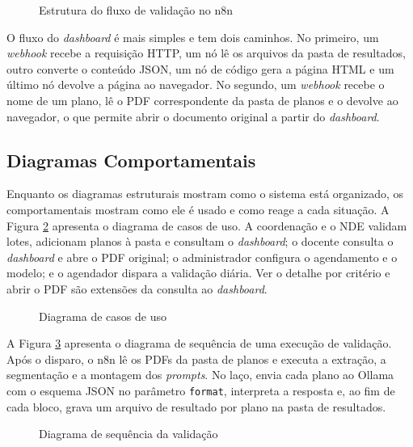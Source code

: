\begin{figure}[htbp]
\centering
\caption{Estrutura do fluxo de validação no n8n}
\label{fig:pipeline}
\resizebox{\textwidth}{!}{}
\end{figure}

O fluxo do \textit{dashboard} é mais simples e tem dois caminhos. No primeiro, um \textit{webhook} recebe a requisição HTTP, um nó lê os arquivos da pasta de resultados, outro converte o conteúdo JSON, um nó de código gera a página HTML e um último nó devolve a página ao navegador. No segundo, um \textit{webhook} recebe o nome de um plano, lê o PDF correspondente da pasta de planos e o devolve ao navegador, o que permite abrir o documento original a partir do \textit{dashboard}.

\subsection{Diagramas Comportamentais}

Enquanto os diagramas estruturais mostram como o sistema está organizado, os comportamentais mostram como ele é usado e como reage a cada situação. A Figura \ref{fig:casos} apresenta o diagrama de casos de uso. A coordenação e o NDE validam lotes, adicionam planos à pasta e consultam o \textit{dashboard}; o docente consulta o \textit{dashboard} e abre o PDF original; o administrador configura o agendamento e o modelo; e o agendador dispara a validação diária. Ver o detalhe por critério e abrir o PDF são extensões da consulta ao \textit{dashboard}.

\begin{figure}[htbp]
\centering
\caption{Diagrama de casos de uso}
\label{fig:casos}
\resizebox{0.95\textwidth}{!}{}
\end{figure}

A Figura \ref{fig:sequencia} apresenta o diagrama de sequência de uma execução de validação. Após o disparo, o n8n lê os PDFs da pasta de planos e executa a extração, a segmentação e a montagem dos \textit{prompts}. No laço, envia cada plano ao Ollama com o esquema JSON no parâmetro \texttt{format}, interpreta a resposta e, ao fim de cada bloco, grava um arquivo de resultado por plano na pasta de resultados.

\begin{figure}[htbp]
\centering
\caption{Diagrama de sequência da validação}
\label{fig:sequencia}
\resizebox{\textwidth}{!}{}
\end{figure}


